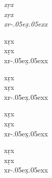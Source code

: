 \documentclass[output=book,nonflat,
  colorlinks,citecolor=brown, 
		  ]{langsci/langscibook}
\begin{document}
 
 
 
  
\maketitle                
\frontmatter 

{\sloppy\tableofcontents}
 
 
  
\mainmatter     

\newcommand{\R}{r\kern-.05ex{̣}\kern.05ex}
{\itshape
\Huge
\noindent
xṛx\\
x\d{r}x\\
x{\R}x

\normalsize
\noindent
xṛx\\
x\d{r}x\\
x{\R}x

\scriptsize
\noindent
xṛx\\
x\d{r}x\\
x{\R}x

\footnotesize
\noindent
xṛx\\
x\d{r}x\\
x{\R}x

\LARGE
\noindent
xṛx\\
x\d{r}x\\
x{\R}x
}

 


  


 
 
\end{document}
